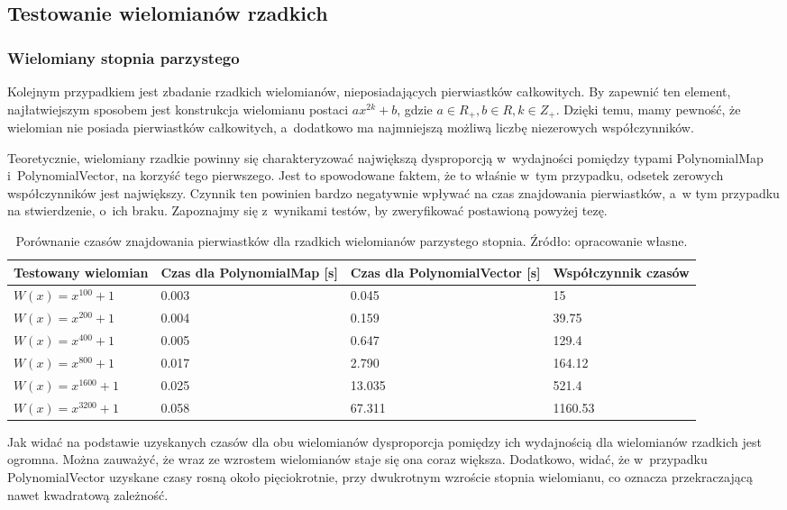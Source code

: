 \subsection{Testowanie wielomianów rzadkich}

\subsubsection{Wielomiany stopnia parzystego}

Kolejnym przypadkiem jest zbadanie rzadkich wielomianów, nieposiadających pierwiastków całkowitych. By zapewnić ten element, najłatwiejszym sposobem jest konstrukcja wielomianu postaci $ax^{2k}+b$, gdzie $a \in R_+, b \in R, k \in Z_+$. Dzięki temu, mamy pewność, że wielomian nie posiada pierwiastków całkowitych, a~dodatkowo ma najmniejszą możliwą liczbę niezerowych współczynników.

Teoretycznie, wielomiany rzadkie powinny się charakteryzować największą dysproporcją w~wydajności pomiędzy typami PolynomialMap i~PolynomialVector, na korzyść tego pierwszego. Jest to spowodowane faktem, że to właśnie w~tym przypadku, odsetek zerowych współczynników jest największy. Czynnik ten powinien bardzo negatywnie wpływać na czas znajdowania pierwiastków, a~w tym przypadku na stwierdzenie, o~ich braku. Zapoznajmy się z~wynikami testów, by zweryfikować postawioną powyżej tezę.

\begin{table}[H]
	\begin{tabular}{ |p{3.5cm}|p{3cm}|p{3cm}|p{3.5cm}|} 
		\hline
		Testowany wielomian & Czas dla PolynomialMap [s] & Czas dla PolynomialVector [s] & Współczynnik czasów \\
		\hline
		$W(x) = x^{100} + 1$ & 0.003 & 0.045 & 15 \\
		$W(x) = x^{200} + 1$ & 0.004 & 0.159 & 39.75 \\
		$W(x) = x^{400} + 1$ & 0.005 & 0.647 & 129.4 \\
		$W(x) = x^{800} + 1$ & 0.017 & 2.790 & 164.12 \\
		$W(x) = x^{1600} + 1$ & 0.025 & 13.035 & 521.4 \\
		$W(x) = x^{3200} + 1$ & 0.058 & 67.311 & 1160.53 \\
		\hline
	\end{tabular}
	\caption{Porównanie czasów znajdowania pierwiastków dla rzadkich wielomianów parzystego stopnia. Źródło: opracowanie własne.}
\end{table}

Jak widać na podstawie uzyskanych czasów dla obu wielomianów dysproporcja pomiędzy ich wydajnością dla wielomianów rzadkich jest ogromna. Można zauważyć, że wraz ze wzrostem wielomianów staje się ona coraz większa. Dodatkowo, widać, że w~przypadku PolynomialVector uzyskane czasy rosną około pięciokrotnie, przy dwukrotnym wzroście stopnia wielomianu, co oznacza przekraczającą nawet kwadratową zależność.

